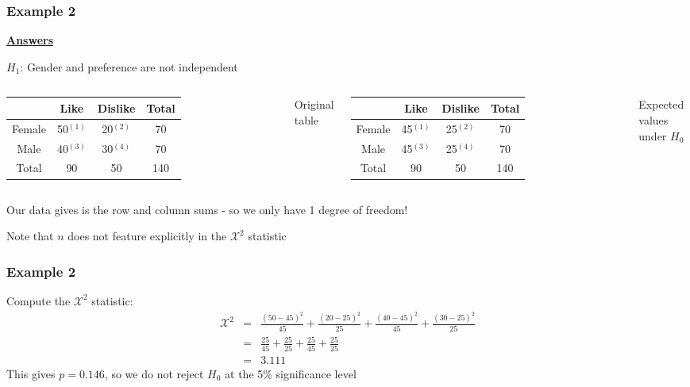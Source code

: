 \documentclass[t,8pt]{beamer}%
\begin{document}
\begin{frame}
	\frametitle{Example 2}
    {\bf\underline{Answers}} \par
    $H_1$: Gender and preference are not independent
    \begin{columns}
		\centering
			\begin{tabular}{ c | c  c | c }
				& Like & Dislike & Total \\ \hline
				Female & 50$^{(1)}$ & 20$^{(2)}$ & 70 \\ %
				Male & 40$^{(3)}$ & 30$^{(4)}$ & 70 \\ \hline
				Total & 90 & 50 & 140
			\end{tabular}
			\vspace{5pt}
			Original table
		\centering
		\begin{tabular}{ c | c  c | c }
			& Like & Dislike & Total \\ \hline
			Female & 45$^{(1)}$ & 25$^{(2)}$ & 70 \\ %
			Male & 45$^{(3)}$ & 25$^{(4)}$ & 70 \\ \hline
			Total & 90 & 50 & 140
		\end{tabular}
		\vspace{5pt}
		Expected values under $H_0$
	\end{columns}
    Our data gives is the row and column sums - so we only have 1 degree of freedom! \par
    Note that $n$ does not feature explicitly in the $\mathcal{X}^2$ statistic
\end{frame}

\begin{frame}
	\frametitle{Example 2}
    Compute the $\mathcal{X}^2$ statistic:
    \begin{eqnarray*}
        \mathcal{X}^2&=&\frac{(50-45)^2}{45}+\frac{(20-25)^2}{25}+\frac{(40-45)^2}{45}+\frac{(30-25)^2}{25}\\
        &=&\frac{25}{45}+\frac{25}{25}+\frac{25}{45}+\frac{25}{25}\\
        &=&3.111
    \end{eqnarray*}
    This gives $p=0.146$, so we do not reject $H_0$ at the 5\% significance level
\end{frame}
\end{document}
